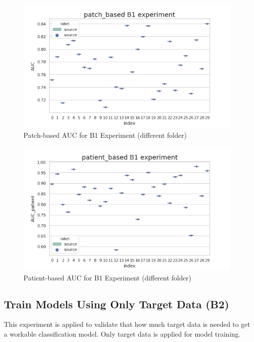 \begin{figure}[H]
    \hfil
    \begin{minipage}[t]{0.9\textwidth}
        \includegraphics[width=\textwidth]{fig/B1_index_patch.png}
        \caption{\label{fig:parallel1} Patch-based AUC for B1 Experiment (different folder)}
    \end{minipage}
    \hfil
\end{figure}
\begin{figure}[H]
    \hfil
    \begin{minipage}[t]{0.9\textwidth}
        \includegraphics[width=\textwidth]{fig/B1_index_patient.png}
        \caption{\label{fig:parallel1} Patient-based AUC for B1 Experiment (different folder)}
    \end{minipage}
    \hfil
\end{figure}
\subsection{Train Models Using Only Target Data (B2)}
This experiment is applied to validate that how much target data is needed to get a workable classification model. Only target data is applied for model training. 

